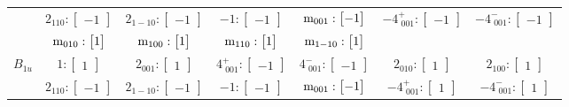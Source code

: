 \documentclass[fleqn,8pt,landscape]{jsarticle}
\begin{document}
\begin{longtable}{ccccccc}
& $ 2{}_{110}:\begin{bmatrix} -1 \end{bmatrix} $ & $ 2{}_{1-10}:\begin{bmatrix} -1 \end{bmatrix} $ & $ -1:\begin{bmatrix} -1 \end{bmatrix} $ & $ {\rm m}_{001}:\begin{bmatrix} -1 \end{bmatrix} $ & $ -4^{+}_{\,\,001}:\begin{bmatrix} -1 \end{bmatrix} $ & $ -4^{-}_{\,\,001}:\begin{bmatrix} -1 \end{bmatrix} $ \\
& $ {\rm m}_{010}:\begin{bmatrix} 1 \end{bmatrix} $ & $ {\rm m}_{100}:\begin{bmatrix} 1 \end{bmatrix} $ & $ {\rm m}_{110}:\begin{bmatrix} 1 \end{bmatrix} $ & $ {\rm m}_{1-10}:\begin{bmatrix} 1 \end{bmatrix} $ & $  $ & $  $ \\ \hline
$ B_{1u} $ & $ 1:\begin{bmatrix} 1 \end{bmatrix} $ & $ 2{}_{001}:\begin{bmatrix} 1 \end{bmatrix} $ & $ 4^{+}_{\,\,001}:\begin{bmatrix} -1 \end{bmatrix} $ & $ 4^{-}_{\,\,001}:\begin{bmatrix} -1 \end{bmatrix} $ & $ 2{}_{010}:\begin{bmatrix} 1 \end{bmatrix} $ & $ 2{}_{100}:\begin{bmatrix} 1 \end{bmatrix} $ \\
& $ 2{}_{110}:\begin{bmatrix} -1 \end{bmatrix} $ & $ 2{}_{1-10}:\begin{bmatrix} -1 \end{bmatrix} $ & $ -1:\begin{bmatrix} -1 \end{bmatrix} $ & $ {\rm m}_{001}:\begin{bmatrix} -1 \end{bmatrix} $ & $ -4^{+}_{\,\,001}:\begin{bmatrix} 1 \end{bmatrix} $ & $ -4^{-}_{\,\,001}:\begin{bmatrix} 1 \end{bmatrix} $ \\

\end{longtable}
\end{document}

